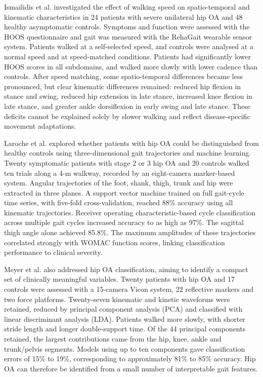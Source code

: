 \documentclass[12pt]{elsarticle}
\begin{document}
{ Ismailidis et al. \cite{ismailidis2021kinematic} investigated the effect of walking speed on spatio-temporal and kinematic characteristics in 24 patients with severe unilateral hip OA and 48 healthy asymptomatic controls. Symptoms and function were assessed with the HOOS questionnaire and gait was measured with the RehaGait wearable sensor system. Patients walked at a self-selected speed, and controls were analysed at a normal speed and at speed-matched conditions. Patients had significantly lower HOOS scores in all subdomains, and walked more slowly with lower cadence than controls. After speed matching, some spatio-temporal differences became less pronounced, but clear kinematic differences remained: reduced hip flexion in stance and swing, reduced hip extension in late stance, increased knee flexion in late stance, and greater ankle dorsiflexion in early swing and late stance. These deficits cannot be explained solely by slower walking and reflect disease-specific movement adaptations.}

{ Laroche et al. \cite{laroche2014classification} explored whether patients with hip OA could be distinguished from healthy controls using three-dimensional gait trajectories and machine learning. Twenty symptomatic patients with stage 2 or 3 hip OA and 20 controls walked ten trials along a 4-m walkway, recorded by an eight-camera marker-based system. Angular trajectories of the foot, shank, thigh, trunk and hip were extracted in three planes. A support vector machine trained on full gait-cycle time series, with five-fold cross-validation, reached 88\% accuracy using all kinematic trajectories. Receiver operating characteristic-based cycle classification across multiple gait cycles increased accuracy to as high as 97\%. The sagittal thigh angle alone achieved 85.8\%. The maximum amplitudes of these trajectories correlated strongly with WOMAC function scores, linking classification performance to clinical severity.}

{ Meyer et al. \cite{meyer2015biomechanical} also addressed hip OA classification, aiming to identify a compact set of clinically meaningful variables. Twenty patients with hip OA and 17 controls were assessed with a 15-camera Vicon system, 22 reflective markers and two force platforms. Twenty-seven kinematic and kinetic waveforms were retained, reduced by principal component analysis (PCA) and classified with linear discriminant analysis (LDA). Patients walked more slowly, with shorter stride length and longer double-support time. Of the 44 principal components retained, the largest contributions came from the hip, knee, ankle and trunk/pelvis segments. Models using up to ten components gave classification errors of 15\% to 19\%, corresponding to approximately 81\% to 85\% accuracy. Hip OA can therefore be identified from a small number of interpretable gait features.}
\end{document}
